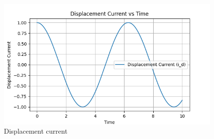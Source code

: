 \documentclass[journal,12pt,twocolumn]{IEEEtran}
\begin{document}
\begin{figure}[ht]
    \centering
    \includegraphics[width=\columnwidth]{2022/EC/24/figs/Figure_4.png}
    \caption{Displacement current}
    \label{fig:fig_gate_ec_2022_24_3}
\end{figure}



\end{document}
